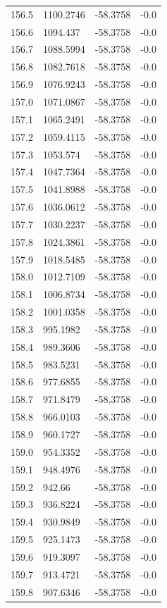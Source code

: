 \begin{table}[H]
\begin{tabular}{llll}
156.5 & 1100.2746 & -58.3758 & -0.0 \\
156.6 & 1094.437 & -58.3758 & -0.0 \\
156.7 & 1088.5994 & -58.3758 & -0.0 \\
156.8 & 1082.7618 & -58.3758 & -0.0 \\
156.9 & 1076.9243 & -58.3758 & -0.0 \\
157.0 & 1071.0867 & -58.3758 & -0.0 \\
157.1 & 1065.2491 & -58.3758 & -0.0 \\
157.2 & 1059.4115 & -58.3758 & -0.0 \\
157.3 & 1053.574 & -58.3758 & -0.0 \\
157.4 & 1047.7364 & -58.3758 & -0.0 \\
157.5 & 1041.8988 & -58.3758 & -0.0 \\
157.6 & 1036.0612 & -58.3758 & -0.0 \\
157.7 & 1030.2237 & -58.3758 & -0.0 \\
157.8 & 1024.3861 & -58.3758 & -0.0 \\
157.9 & 1018.5485 & -58.3758 & -0.0 \\
158.0 & 1012.7109 & -58.3758 & -0.0 \\
158.1 & 1006.8734 & -58.3758 & -0.0 \\
158.2 & 1001.0358 & -58.3758 & -0.0 \\
158.3 & 995.1982 & -58.3758 & -0.0 \\
158.4 & 989.3606 & -58.3758 & -0.0 \\
158.5 & 983.5231 & -58.3758 & -0.0 \\
158.6 & 977.6855 & -58.3758 & -0.0 \\
158.7 & 971.8479 & -58.3758 & -0.0 \\
158.8 & 966.0103 & -58.3758 & -0.0 \\
158.9 & 960.1727 & -58.3758 & -0.0 \\
159.0 & 954.3352 & -58.3758 & -0.0 \\
159.1 & 948.4976 & -58.3758 & -0.0 \\
159.2 & 942.66 & -58.3758 & -0.0 \\
159.3 & 936.8224 & -58.3758 & -0.0 \\
159.4 & 930.9849 & -58.3758 & -0.0 \\
159.5 & 925.1473 & -58.3758 & -0.0 \\
159.6 & 919.3097 & -58.3758 & -0.0 \\
159.7 & 913.4721 & -58.3758 & -0.0 \\
159.8 & 907.6346 & -58.3758 & -0.0 \\

\end{tabular}
\end{table}
